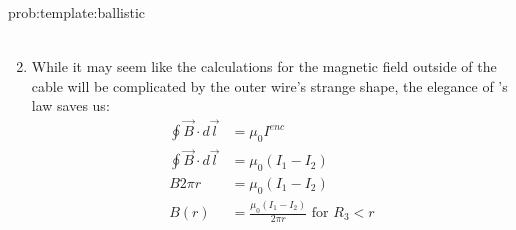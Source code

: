 \begin{solution}{prob:template:ballistic}
\begin{enumerate}[label=\alph*),topsep=-10pt]
\begin{align*}
	\end{align*}
	\item While it may seem like the calculations for the magnetic field outside of the cable will be complicated by the outer wire's strange shape, the elegance of \ampere's law saves us:
	\begin{align*}
	\oint \vec B \cdot d\vec l &= \mu_0 I^{enc}\\
	\oint \vec B \cdot d\vec l &= \mu_0 (I_1-I_2)\\
	B 2\pi r &= \mu_0 (I_1-I_2)\\
	B(r) &= \frac{\mu_0 (I_1-I_2)}{2\pi r} \text{		for  } R_3 < r\\
	\end{align*}
\end{enumerate}
\end{solution}

